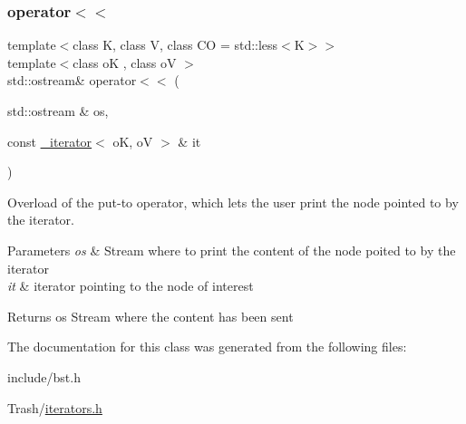 \subsubsection{\texorpdfstring{operator$<$$<$}{operator<<}}
{\footnotesize\ttfamily template$<$class K, class V, class CO = std\+::less$<$\+K$>$$>$ \\
template$<$class oK , class oV $>$ \\
std\+::ostream\& operator$<$$<$ (\begin{DoxyParamCaption}\item[{std\+::ostream \&}]{os,  }\item[{const \hyperlink{classbst_1_1__iterator}{\+\_\+iterator}$<$ oK, oV $>$ \&}]{it }\end{DoxyParamCaption})\hspace{0.3cm}{\ttfamily [friend]}}



Overload of the put-\/to operator, which lets the user print the node pointed to by the iterator. 


\begin{DoxyParams}{Parameters}
{\em os} & Stream where to print the content of the node poited to by the iterator \\
\hline
{\em it} & iterator pointing to the node of interest \\
\hline
\end{DoxyParams}
\begin{DoxyReturn}{Returns}
os Stream where the content has been sent 
\end{DoxyReturn}


The documentation for this class was generated from the following files\+:\begin{DoxyCompactItemize}
\item 
include/bst.\+h\item 
Trash/\hyperlink{iterators_8h}{iterators.\+h}\end{DoxyCompactItemize}
